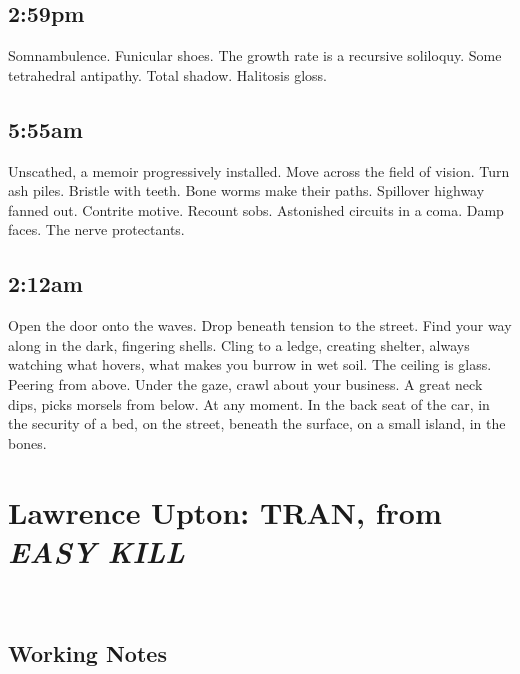 \documentclass[
]{memoir}
\begin{document}
\hypertarget{pm-1}{%
\section*{2:59pm}\label{pm-1}}

Somnambulence. Funicular shoes. The growth rate is a recursive
soliloquy. Some tetrahedral antipathy. Total shadow. Halitosis gloss.

\hypertarget{am-9}{%
\section*{5:55am}\label{am-9}}

Unscathed, a memoir progressively installed. Move across the field of
vision. Turn ash piles. Bristle with teeth. Bone worms make their paths.
Spillover highway fanned out. Contrite motive. Recount sobs. Astonished
circuits in a coma. Damp faces. The nerve protectants.

\hypertarget{am-10}{%
\section*{2:12am}\label{am-10}}

Open the door onto the waves. Drop beneath tension to the street. Find
your way along in the dark, fingering shells. Cling to a ledge, creating
shelter, always watching what hovers, what makes you burrow in wet soil.
The ceiling is glass. Peering from above. Under the gaze, crawl about
your business. A great neck dips, picks morsels from below. At any
moment. In the back seat of the car, in the security of a bed, on the
street, beneath the surface, on a small island, in the bones.

\hypertarget{lawrence-upton-tran-from-easy-kill}{%
\chapter{\texorpdfstring{Lawrence Upton: TRAN, from \emph{EASY
KILL}}{Lawrence Upton: TRAN, from EASY KILL}}\label{lawrence-upton-tran-from-easy-kill}}

~

\hypertarget{working-notes-7}{%
\section*{Working Notes}\label{working-notes-7}}
\end{document}
